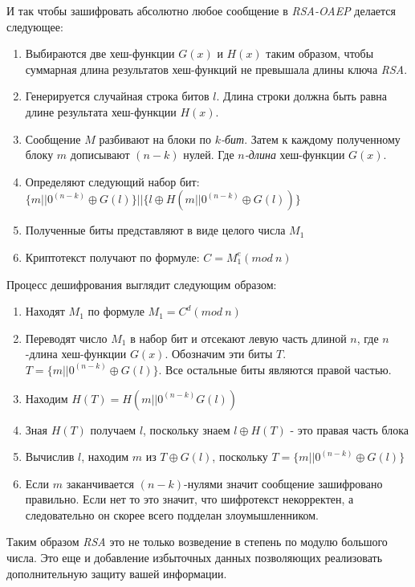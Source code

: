   И так чтобы зашифровать абсолютно любое сообщение в \textit{RSA-OAEP} делается следующее:
    \begin{enumerate}
	    \item Выбираются две хеш-функции {$G(x)$} и {$H(x)$} таким образом, чтобы суммарная длина результатов хеш-функций не превышала длины 
	      ключа \textit{RSA}.
	    \item Генерируется случайная строка битов {$l$}. Длина строки должна быть равна длине результата хеш-функции {$H(x)$}.
	    \item Сообщение {$M$} разбивают на блоки по \textit{{$k$}-бит}. Затем к каждому полученному блоку {$m$} дописывают {$(n-k)$} нулей. 
	      Где \textit{{$n$}-длина} хеш-функции {$G(x)$}.
	    \item Определяют следующий набор бит: {$ \{m||0^{(n-k)} \oplus G(l)\}||\{l \oplus H(m||0^{(n-k)} \oplus G(l))\} $}
	    \item Полученные биты представляют в виде целого числа {$M_1$}
	    \item Криптотекст получают по формуле: {$ C=M_{1}^{e}(mod \: n) $}
    \end{enumerate}

  Процесс дешифрования выглядит следующим образом:
    \begin{enumerate}
	    \item Находят {$M_1$} по формуле \textit{$ M_{1}=C^{d}(mod \: n) $}
	    \item Переводят число $M_1$ в набор бит и отсекают левую часть длиной $n$, где {$n$}-длина 
	      хеш-функции {$G(x)$}. Обозначим эти биты {$T$}. {$T= \{m||0^{(n-k)} \oplus G(l)\} $}. Все 
	      остальные биты являются правой частью.
	    \item Находим {$ H(T)=H(m||0^{(n-k)} G(l)) $}
	    \item Зная {$H(T)$} получаем {$l$}, поскольку знаем {$l \oplus H(T)$} - это правая часть блока
	    \item Вычислив {$l$}, находим {$m$} из {$T \oplus G(l)$}, поскольку {$ T=\{m||0^{(n-k)} \oplus G(l)\} $}
	    \item Если {$m$} заканчивается {$(n-k)$}-нулями значит сообщение зашифровано правильно. Если нет то это значит, что шифротекст 
	      некорректен, а следовательно он скорее всего подделан злоумышленником.
    \end{enumerate}

  Таким образом \textit{RSA} это не только возведение в степень по модулю большого числа. Это еще и добавление избыточных данных позволяющих реализовать 
  дополнительную защиту вашей информации.

